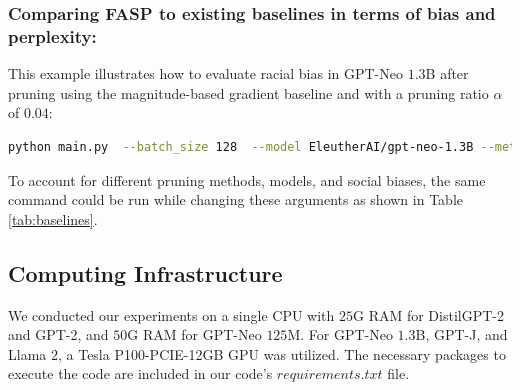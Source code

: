 \documentclass[letterpaper]{article} %
\begin{document}
\subsubsection{Comparing FASP to existing baselines in terms of bias and perplexity:}\label{sec:compute_baselines}

This example  illustrates how to evaluate racial bias in GPT-Neo $1.3$B after pruning using the magnitude-based gradient baseline \cite{NEURIPS2019_2c601ad9} and with a pruning ratio $\alpha$ of $0.04$:
 \begin{lstlisting}[language=bash,numbers=none]
python main.py  --batch_size 128  --model EleutherAI/gpt-neo-1.3B --method mask_gradient_l2_structured --pruned_heads_ratio 0.04 --targeted_holistic_bias race_ethnicity --prompting holistic --seed 1 

\end{lstlisting}
To account for different pruning methods, models, and social biases, the same command could be run while changing these arguments as shown in Table \ref{tab:baselines}.





 

\subsection{Computing Infrastructure}

We conducted our experiments on a single CPU with $25$G RAM for DistilGPT-2 and GPT-2, and $50$G RAM for GPT-Neo $125$M. For GPT-Neo $1.3$B, GPT-J, and Llama $2$, a Tesla P100-PCIE-12GB GPU was utilized. The necessary packages to execute the code are included in our code's $requirements.txt$ file.


\end{document}
